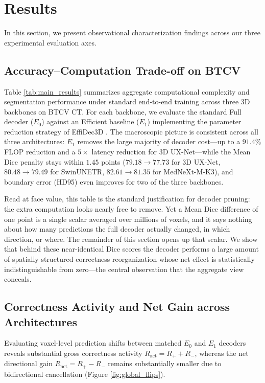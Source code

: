 \section{Results}
\label{sec:results}

In this section, we present observational characterization findings across our three experimental evaluation axes.

\subsection{Accuracy--Computation Trade-off on BTCV}
\label{sec:results_cross_arch}

Table \ref{tab:main_results} summarizes aggregate computational complexity and segmentation performance under standard end-to-end training across three 3D backbones on BTCV CT. For each backbone, we evaluate the standard Full decoder ($E_0$) against an Efficient baseline ($E_1$) implementing the parameter reduction strategy of EffiDec3D \cite{effidec3d}. The macroscopic picture is consistent across all three architectures: $E_1$ removes the large majority of decoder cost---up to a $91.4\%$ FLOP reduction and a $5\times$ latency reduction for 3D UX-Net---while the Mean Dice penalty stays within $1.45$ points ($79.18\rightarrow77.73$ for 3D UX-Net, $80.48\rightarrow79.49$ for SwinUNETR, $82.61\rightarrow81.35$ for MedNeXt-M-K3), and boundary error (HD95) even improves for two of the three backbones.

Read at face value, this table is the standard justification for decoder pruning: the extra computation looks nearly free to remove. Yet a Mean Dice difference of one point is a single scalar averaged over millions of voxels, and it says nothing about how many predictions the full decoder actually changed, in which direction, or where. The remainder of this section opens up that scalar. We show that behind these near-identical Dice scores the decoder performs a large amount of spatially structured correctness reorganization whose net effect is statistically indistinguishable from zero---the central observation that the aggregate view conceals.



\subsection{Correctness Activity and Net Gain across Architectures}
\label{sec:results_activity}

Evaluating voxel-level prediction shifts between matched $E_0$ and $E_1$ decoders reveals substantial gross correctness activity $R_{\text{act}} = R_{+} + R_{-}$, whereas the net directional gain $R_{\text{net}} = R_{+} - R_{-}$ remains substantially smaller due to bidirectional cancellation (Figure \ref{fig:global_flips}).

